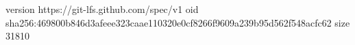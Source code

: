 version https://git-lfs.github.com/spec/v1
oid sha256:469800b846d3afeee323caae110320e0cf8266f9609a239b95d562f548acfc62
size 31810

